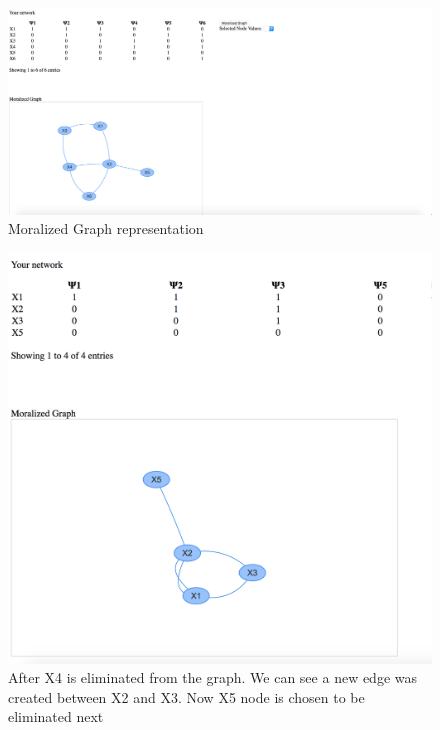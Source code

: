 \documentclass{article}
\begin{document}
    \begin{figure}[hb!]
        \includegraphics[width=\linewidth]{img/moralized_graph.png}
        \caption{Moralized Graph representation}
        \label{fig:moralized_graph}
    \end{figure}

    \begin{figure}[hb!]
        \includegraphics[width=\linewidth]{img/after_x4_elimination.png}
        \caption{After X4 is eliminated from the graph. We can see a new edge was created between X2 and X3. Now X5 node is chosen to be eliminated next}
        \label{fig:elimination}
    \end{figure}
\end{document}

